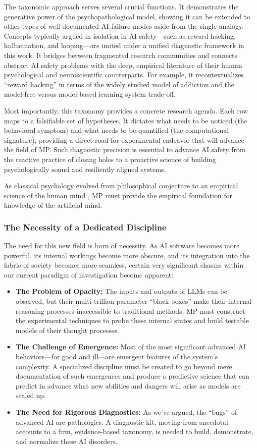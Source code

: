 \documentclass{article}
\begin{document}
The taxonomic approach serves several crucial functions. It demonstrates the generative power of the psychopathological model, showing it can be extended to other types of well-documented AI failure modes aside from the single analogy. Concepts typically argued in isolation in AI safety—such as reward hacking, hallucination, and looping—are united under a unified diagnostic framework in this work. It bridges between fragmented research communities and connects abstract AI safety problems with the deep, empirical literature of their human psychological and neuroscientific counterparts. For example, it recontextualizes “reward hacking” in terms of the widely studied model of addiction and the model-free versus model-based learning system trade-off.

Most importantly, this taxonomy provides a concrete research agenda. Each row maps to a falsifiable set of hypotheses. It dictates what needs to be noticed (the behavioral symptom) and what needs to be quantified (the computational signature), providing a direct road for experimental endeavor that will advance the field of MP. Such diagnostic precision is essential to advance AI safety from the reactive practice of closing holes to a proactive science of building psychologically sound and resiliently aligned systems.

As classical psychology evolved from philosophical conjecture to an empirical science of the human mind \citep{ref14}, MP must provide the empirical foundation for knowledge of the artificial mind.

\subsubsection{The Necessity of a Dedicated Discipline}
The need for this new field is born of necessity. As AI software becomes more powerful, its internal workings become more obscure, and its integration into the fabric of society becomes more seamless, certain very significant chasms within our current paradigm of investigation become apparent:
\begin{itemize}
    \item \textbf{The Problem of Opacity:} The inputs and outputs of LLMs can be observed, but their multi-trillion parameter “black boxes” make their internal reasoning processes inaccessible to traditional methods. MP must construct the experimental techniques to probe these internal states and build testable models of their thought processes.
    \item \textbf{The Challenge of Emergence:} Most of the most significant advanced AI behaviors—for good and ill—are emergent features of the system's complexity. A specialized discipline must be created to go beyond mere documentation of such emergences and produce a predictive science that can predict in advance what new abilities and dangers will arise as models are scaled up.
    \item \textbf{The Need for Rigorous Diagnostics:} As we've argued, the “bugs” of advanced AI are pathologies. A diagnostic kit, moving from anecdotal accounts to a firm, evidence-based taxonomy, is needed to build, demonstrate, and normalize these AI disorders.
\end{itemize}
\end{document}
